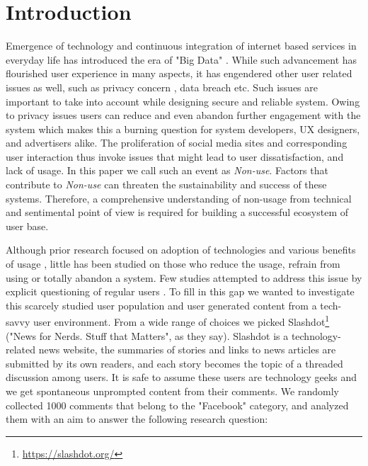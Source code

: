 \section{Introduction}
\label{sec:introduction}

Emergence of technology and continuous integration of internet based services in everyday life has introduced the era of "Big Data" \cite{lohr2012age}. While such advancement has flourished user experience in many aspects, it has engendered other user related issues as well, such as privacy concern \cite{shin2010effects}, data breach etc. Such issues are important to take into account while designing secure and reliable system. Owing to privacy issues users can reduce and even abandon further engagement with the system \cite{madden2012privacy} which makes this a burning question for system developers, UX designers, and advertisers alike. The proliferation of social media sites and corresponding user interaction thus invoke issues that might lead to user dissatisfaction, and lack of usage. In this paper we call such an event as \emph{Non-use}. Factors that contribute to \emph{Non-use} can threaten the sustainability and success of these systems. Therefore, a comprehensive understanding of non-usage from technical and sentimental point of view is required for building a successful ecosystem of user base.


Although prior research focused on adoption of technologies and various benefits of usage \cite{joinson2008looking}, little has been studied on those who reduce the usage, refrain from using or totally abandon a system. Few studies attempted to address this issue by explicit questioning of regular users \cite{baumer2013limiting, nonnecke2001lurkers}. To fill in this gap we wanted to investigate this scarcely studied user population \cite{baumer2014refusing} and user generated content from a tech-savvy user environment. From a wide range of choices we picked Slashdot\footnote{\url{https://slashdot.org/}} ("News for Nerds. Stuff that Matters", as they say). Slashdot is a technology-related news website, the summaries of stories and links to news articles are submitted by its own readers, and each story becomes the topic of a threaded discussion among users. It is safe to assume these users are technology geeks and we get spontaneous unprompted content from their comments. We randomly collected 1000 comments that belong to the "Facebook" category, and analyzed them with an aim to answer the following research question:

